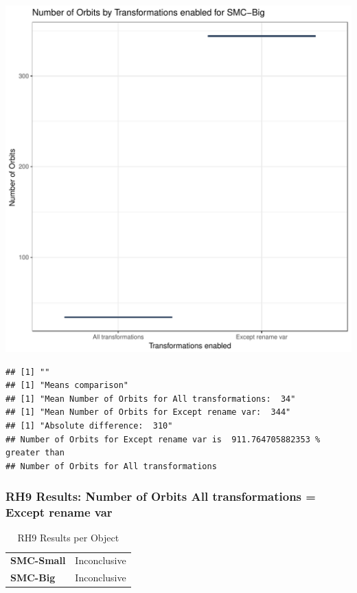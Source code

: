 \documentclass{article}\usepackage[]{graphicx}\usepackage[]{color}
\makeatletter
\def\maxwidth{ %
  \ifdim\Gin@nat@width>\linewidth
    \linewidth
  \else
    \Gin@nat@width
  \fi
}
\newenvironment{kframe}{%
 \def\at@end@of@kframe{}%
 \ifinner\ifhmode%
  \def\at@end@of@kframe{\end{minipage}}%
  \begin{minipage}{\columnwidth}%
 \fi\fi%
 \def\FrameCommand##1{\hskip\@totalleftmargin \hskip-\fboxsep
 \colorbox{shadecolor}{##1}\hskip-\fboxsep
     \hskip-\linewidth \hskip-\@totalleftmargin \hskip\columnwidth}%
 \MakeFramed {\advance\hsize-\width
   \@totalleftmargin\z@ \linewidth\hsize
   \@setminipage}}%
 {\par\unskip\endMakeFramed%
 \at@end@of@kframe}
\newenvironment{knitrout}{}{} %
\makeatother
\begin{document}
\begin{knitrout}
\color{fgcolor}
\includegraphics[width=\maxwidth]{figure/RH9_big-1} 
\begin{kframe}

{\ttfamily\noindent\bfseries\color{errorcolor}{\#\# Error in eval(expr, envir, enclos): object 'shap\_cashew\_big' not found}}\begin{verbatim}
## [1] ""
## [1] "Means comparison"
## [1] "Mean Number of Orbits for All transformations:  34"
## [1] "Mean Number of Orbits for Except rename var:  344"
## [1] "Absolute difference:  310"
## Number of Orbits for Except rename var is  911.764705882353 % greater than 
## Number of Orbits for All transformations
\end{verbatim}
\end{kframe}
\end{knitrout}


 

	
	\subsubsection{RH9 Results: Number of Orbits All transformations = Except rename var}
	
	
	\begin{table}[H]
	\centering
	\caption{RH9 Results per Object}
	\begin{tabular}{ll}
	\textbf{SMC-Small} & Inconclusive \\
	\textbf{SMC-Big} & Inconclusive \\
	\end{tabular}
	\end{table}
\end{document}
